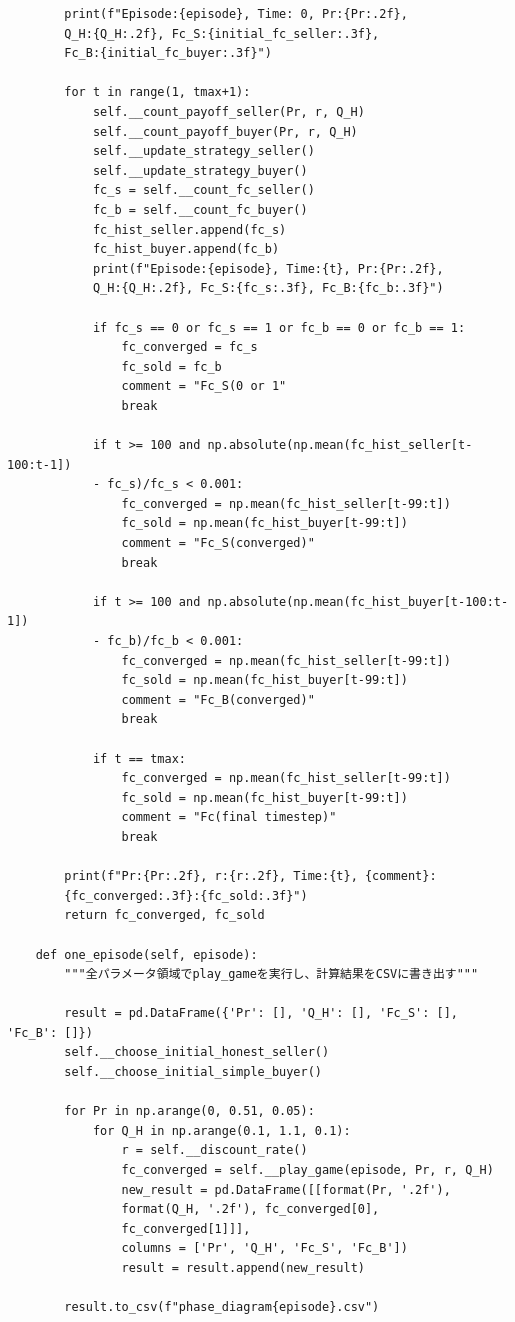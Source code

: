 \documentclass[a4paper,fontsize=11pt,report,notitlepage,line_length=38zw,number_of_lines=40,dvipdfmx]{jlreq}
\begin{document}
\begin{lstlisting}
        print(f"Episode:{episode}, Time: 0, Pr:{Pr:.2f}, 
        Q_H:{Q_H:.2f}, Fc_S:{initial_fc_seller:.3f}, 
        Fc_B:{initial_fc_buyer:.3f}")

        for t in range(1, tmax+1):
            self.__count_payoff_seller(Pr, r, Q_H)
            self.__count_payoff_buyer(Pr, r, Q_H)
            self.__update_strategy_seller()
            self.__update_strategy_buyer()
            fc_s = self.__count_fc_seller()
            fc_b = self.__count_fc_buyer()
            fc_hist_seller.append(fc_s)
            fc_hist_buyer.append(fc_b)
            print(f"Episode:{episode}, Time:{t}, Pr:{Pr:.2f}, 
            Q_H:{Q_H:.2f}, Fc_S:{fc_s:.3f}, Fc_B:{fc_b:.3f}")
 
            if fc_s == 0 or fc_s == 1 or fc_b == 0 or fc_b == 1:
                fc_converged = fc_s
                fc_sold = fc_b
                comment = "Fc_S(0 or 1"
                break

            if t >= 100 and np.absolute(np.mean(fc_hist_seller[t-100:t-1])
            - fc_s)/fc_s < 0.001:
                fc_converged = np.mean(fc_hist_seller[t-99:t])
                fc_sold = np.mean(fc_hist_buyer[t-99:t])
                comment = "Fc_S(converged)"
                break

            if t >= 100 and np.absolute(np.mean(fc_hist_buyer[t-100:t-1]) 
            - fc_b)/fc_b < 0.001:
                fc_converged = np.mean(fc_hist_seller[t-99:t])
                fc_sold = np.mean(fc_hist_buyer[t-99:t])
                comment = "Fc_B(converged)"
                break

            if t == tmax:
                fc_converged = np.mean(fc_hist_seller[t-99:t])
                fc_sold = np.mean(fc_hist_buyer[t-99:t])
                comment = "Fc(final timestep)"
                break

        print(f"Pr:{Pr:.2f}, r:{r:.2f}, Time:{t}, {comment}:
        {fc_converged:.3f}:{fc_sold:.3f}")
        return fc_converged, fc_sold

    def one_episode(self, episode):
        """全パラメータ領域でplay_gameを実行し、計算結果をCSVに書き出す"""

        result = pd.DataFrame({'Pr': [], 'Q_H': [], 'Fc_S': [], 'Fc_B': []})
        self.__choose_initial_honest_seller()
        self.__choose_initial_simple_buyer()

        for Pr in np.arange(0, 0.51, 0.05):
            for Q_H in np.arange(0.1, 1.1, 0.1):
                r = self.__discount_rate()
                fc_converged = self.__play_game(episode, Pr, r, Q_H)
                new_result = pd.DataFrame([[format(Pr, '.2f'), 
                format(Q_H, '.2f'), fc_converged[0],
                fc_converged[1]]], 
                columns = ['Pr', 'Q_H', 'Fc_S', 'Fc_B'])
                result = result.append(new_result)
        
        result.to_csv(f"phase_diagram{episode}.csv")

\end{lstlisting}
\end{document}
